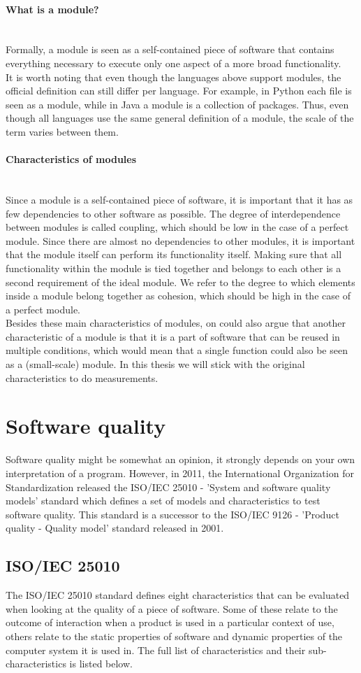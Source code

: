 \documentclass[twoside]{uva-inf-bachelor-thesis}
\newcommand{\myparagraph}[1]{\paragraph{#1}\mbox{}\\}
\begin{document}
\myparagraph{What is a module?}
Formally, a module is seen as a self-contained piece of software that contains everything necessary to execute only one aspect of a more broad functionality.\\

It is worth noting that even though the languages above support modules, the official definition can still differ per language. For example, in Python each file is seen as a module, while in Java a module is a collection of packages. Thus, even though all languages use the same general definition of a module, the scale of the term varies between them.

\myparagraph{Characteristics of modules}
Since a module is a self-contained piece of software, it is important that it has as few dependencies to other software as possible. The degree of interdependence between modules is called coupling, which should be low in the case of a perfect module. Since there are almost no dependencies to other modules, it is important that the module itself can perform its functionality itself. Making sure that all functionality within the module is tied together and belongs to each other is a second requirement of the ideal module. We refer to the degree to which elements inside a module belong together as cohesion, which should be high in the case of a perfect module.\\

Besides these main characteristics of modules, on could also argue that another characteristic of a module is that it is a part of software that can be reused in multiple conditions, which would mean that a single function could also be seen as a (small-scale) module. In this thesis we will stick with the original characteristics to do measurements.

\section{Software quality}
Software quality might be somewhat an opinion, it strongly depends on your own interpretation of a program. However, in 2011, the International Organization for Standardization released the ISO/IEC 25010 - 'System and software quality models' standard\cite{ISO25010} which defines a set of models and characteristics to test software quality. This standard is a successor to the ISO/IEC 9126 - 'Product quality - Quality model' standard\cite{ISO9126} released in 2001.

\subsection{ISO/IEC 25010}
The ISO/IEC 25010 standard defines eight characteristics that can be evaluated when looking at the quality of a piece of software. Some of these relate to the outcome of interaction when a product is used in a particular context of use, others relate to the static properties of software and dynamic properties of the computer system it is used in. The full list of characteristics and their sub-characteristics is listed below.
\end{document}

